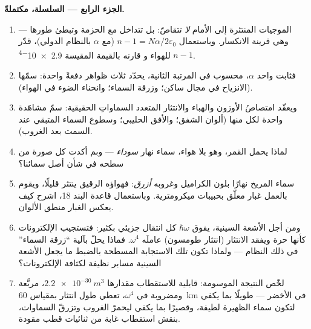 \begin{problem}
\medskip\noindent\textbf{الجزء الرابع --- السلسلة، مكتملةً.}
\begin{enumerate}[resume]
  \item الموجيات المنتثرة إلى الأمام \emph{لا} تتقاصّ: بل
        تتداخل مع الحزمة وتبطئ طورها --- وهي
        قرينة الانكسار. وباستعمال $n - 1 = N\alpha/2\varepsilon_0$
        (مع $\alpha$ بالنظام الدولي)، قدّر $n - 1$ للهواء و
        قارنه بالقيمة المقيسة \num{2.9e-4}.
  \item فثابت واحد $\alpha$، محسوب  في
        المرتبة الثانية، يحدّد ثلاث ظواهر دفعةً واحدة:
        سمّها (الانزياح في مجال ساكن؛ وزرقة السماء؛ وانحناء
        الضوء في الهواء).
  \item ويعقّد امتصاصُ الأوزون والهباء والانتثار المتعدد
        السماواتِ الحقيقية: سمّ مشاهَدة واحدة لكل منها
        (ألوان الشفق؛ والأفق الحليبي؛ وسطوع السماء المتبقي
        عند السمت بعد الغروب).
  \item لماذا يحمل القمر، وهو بلا هواء، سماء نهار
        \emph{سوداء} --- وبم أكدت كل صورة من سطحه
        في شأن أصل سمائنا؟
  \item سماء المريخ نهارًا بلون الكراميل وغروبه \emph{أزرق}:
        فهواؤه الرقيق ينتثر قليلًا، ويقوم بالعمل غبار معلّق
        بحبيبات ميكرومترية. وباستعمال قاعدة
        البند 18، اشرح كيف يعكس الغبار منطق الألوان.
  \item ومن أجل الأشعة السينية، يفوق $\hbar\omega$ كل انتقال جزيئي
        بكثير: فتستجيب الإلكترونات كأنها حرة ويفقد الانتثار
        (انتثار طومسون) عاملَه $\omega^4$. فماذا يحلّ
        بآلية ``زرقة السماء'' في ذلك النظام --- ولماذا تكون تلك
        الاستجابة المسطحة بالضبط ما يجعل الأشعة السينية مسابر نظيفة
        لكثافة الإلكترونات؟
  \item لخّص النتيجة الموسومة: قابلية للاستقطاب مقدارها $\qty{2.2e-30}{m^3}$،
        مربَّعة ومضروبة في $\omega^4$،
        تعطي طول انتثار بمقياس \qty{60}{km} في الأخضر
        --- طويلًا بما يكفي لتكون سماء الظهيرة لطيفة، وقصيرًا بما
        يكفي ليحمرّ الغروب وتزرقّ السماوات، بنقش
        استقطاب غابة من ثنائيات قطب مقودة.
\end{enumerate}
\end{problem}
